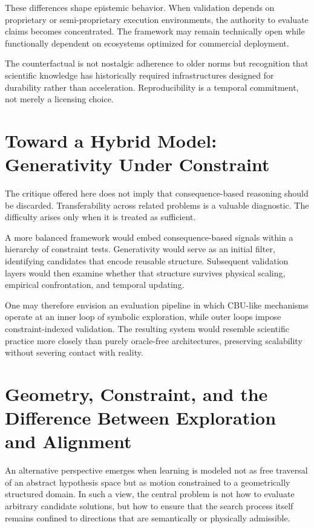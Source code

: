 \documentclass[12pt]{article}
\begin{document}
These differences shape epistemic behavior. When validation depends on proprietary or semi-proprietary execution environments, the authority to evaluate claims becomes concentrated. The framework may remain technically open while functionally dependent on ecosystems optimized for commercial deployment.

The counterfactual is not nostalgic adherence to older norms but recognition that scientific knowledge has historically required infrastructures designed for durability rather than acceleration. Reproducibility is a temporal commitment, not merely a licensing choice.

\section{Toward a Hybrid Model: Generativity Under Constraint}

The critique offered here does not imply that consequence-based reasoning should be discarded. Transferability across related problems is a valuable diagnostic. The difficulty arises only when it is treated as sufficient.

A more balanced framework would embed consequence-based signals within a hierarchy of constraint tests. Generativity would serve as an initial filter, identifying candidates that encode reusable structure. Subsequent validation layers would then examine whether that structure survives physical scaling, empirical confrontation, and temporal updating.

One may therefore envision an evaluation pipeline in which CBU-like mechanisms operate at an inner loop of symbolic exploration, while outer loops impose constraint-indexed validation. The resulting system would resemble scientific practice more closely than purely oracle-free architectures, preserving scalability without severing contact with reality.


\section{Geometry, Constraint, and the Difference Between Exploration and Alignment}

An alternative perspective emerges when learning is modeled not as free traversal of an abstract hypothesis space but as motion constrained to a geometrically structured domain. In such a view, the central problem is not how to evaluate arbitrary candidate solutions, but how to ensure that the search process itself remains confined to directions that are semantically or physically admissible.
\end{document}
